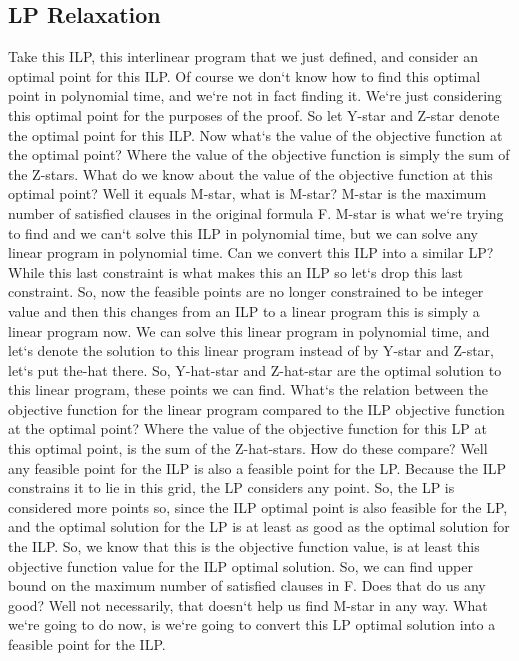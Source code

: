 \subsection{LP Relaxation}
Take this ILP, this interlinear program that we just defined, and consider an optimal point for this ILP\@.
Of course we don`t know how to find this optimal point in polynomial time, and we`re not in fact finding it.
We`re just considering this optimal point for the purposes of the proof.
So let Y-star and Z-star denote the optimal point for this ILP\@.
Now what`s the value of the objective function at the optimal point? Where the value of the objective function is simply the sum of the Z-stars.
What do we know about the value of the objective function at this optimal point? Well it equals M-star, what is M-star? M-star is the maximum number of satisfied clauses in the original formula F\@.
M-star is what we`re trying to find and we can`t solve this ILP in polynomial time, but we can solve any linear program in polynomial time.
Can we convert this ILP into a similar LP? While this last constraint is what makes this an ILP so let`s drop this last constraint.
So, now the feasible points are no longer constrained to be integer value and then this changes from an ILP to a linear program this is simply a linear program now.
We can solve this linear program in polynomial time, and let`s denote the solution to this linear program instead of by Y-star and Z-star, let`s put the-hat there.
So, Y-hat-star and Z-hat-star are the optimal solution to this linear program, these points we can find.
What`s the relation between the objective function for the linear program compared to the ILP objective function at the optimal point? Where the value of the objective function for this LP at this optimal point, is the sum of the Z-hat-stars.
How do these compare? Well any feasible point for the ILP is also a feasible point for the LP\@.
Because the ILP constrains it to lie in this grid, the LP considers any point.
So, the LP is considered more points so, since the ILP optimal point is also feasible for the LP, and the optimal solution for the LP is at least as good as the optimal solution for the ILP\@.
So, we know that this is the objective function value, is at least this objective function value for the ILP optimal solution.
So, we can find upper bound on the maximum number of satisfied clauses in F\@.
Does that do us any good? Well not necessarily, that doesn`t help us find M-star in any way.
What we`re going to do now, is we`re going to convert this LP optimal solution into a feasible point for the ILP\@.
